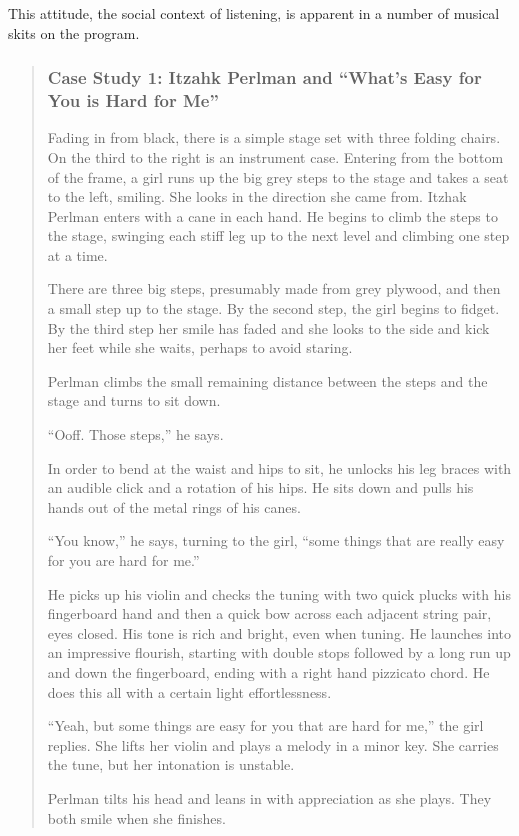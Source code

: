 \documentclass[12pt,letterpaper]{article}
\begin{document}
	This attitude, the social context of listening, is apparent in a number 
	of musical skits on the program.  


	\begin{quote}
	\subsubsection*{Case Study 1: Itzahk Perlman and ``What's Easy for You
	 is Hard for Me''}
	
	\ttfamily

	Fading in from black, there is a simple stage set with three folding 
	chairs. On the third to the right is an instrument case. Entering from 
	the bottom of the frame, a girl runs up the big grey steps to the stage 
	and takes a seat to the left, smiling. She looks in the direction she 
	came from. Itzhak Perlman enters with a cane in each hand. He begins 
	to climb the steps to the stage, swinging each stiff leg up to the next
	level and climbing one step at a time. 

	There are three big steps, presumably made from grey plywood, and then a
	small step up to the stage. By the second step, the girl begins to 
	fidget. By the third step her smile has faded and she looks to the side
	and kick her feet while she waits, perhaps to avoid staring.   

	Perlman climbs the small remaining distance between the steps and the 
	stage and turns to sit down. 

	``Ooff. Those steps,'' he says.

	In order to bend at the waist and hips to sit, he unlocks his leg 
	braces with an audible click and a rotation of his hips. He sits down 
	and pulls his hands out of the metal rings of his canes.

	``You know,'' he says, turning to the girl, ``some things that are 
	really easy for you are hard for me.''

	He picks up his violin and checks the tuning with two quick plucks with 
	his fingerboard hand and then a quick bow across each adjacent string
	pair, eyes closed. His tone is rich and bright, even when tuning. He 
	launches into an impressive flourish, starting with double stops 
	followed by a long run up and down the fingerboard, ending with a right
	hand pizzicato chord. He does this all with a certain light 
	effortlessness.

	``Yeah, but some things are easy for you that are hard for me,'' the 
	girl replies. She lifts her violin and plays a melody in a minor key.
	She 
	carries the tune, but her intonation is unstable. 

	Perlman tilts his head and leans in with appreciation as she plays.
	They both smile when she finishes.   

	\end{quote}
\end{document}
